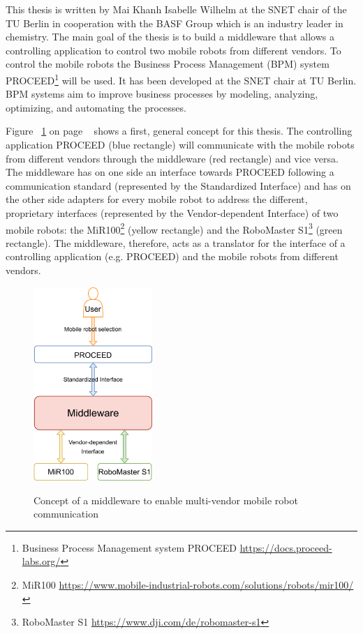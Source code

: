 This thesis is written by Mai Khanh Isabelle Wilhelm at the SNET chair of the TU Berlin in cooperation with the BASF Group which is an industry leader in chemistry. The main goal of the thesis is to build a middleware that allows a controlling application to control two mobile robots from different vendors. To control the mobile robots the Business Process Management (BPM) system PROCEED\footnote{Business Process Management system PROCEED \url{https://docs.proceed-labs.org/}} will be used. It has been developed at the SNET chair at TU Berlin. BPM systems aim to improve business processes by modeling, analyzing, optimizing, and automating the processes. 

Figure ~\ref{fig:introduction__middleware} on page ~\pageref{fig:introduction__middleware} shows a first, general concept for this thesis. The controlling application PROCEED (blue rectangle) will communicate with the mobile robots from different vendors through the middleware (red rectangle) and vice versa. The middleware has on one side an interface towards PROCEED following a communication standard (represented by the Standardized Interface) and has on the other side adapters for every mobile robot to address the different, proprietary interfaces (represented by the Vendor-dependent Interface) of two mobile robots: the MiR100\footnote{MiR100 \url{https://www.mobile-industrial-robots.com/solutions/robots/mir100/}} (yellow rectangle) and the RoboMaster S1\footnote{RoboMaster S1 \url{https://www.dji.com/de/robomaster-s1}} (green rectangle).  The middleware, therefore, acts as a translator for the interface of a controlling application (e.g. PROCEED) and the mobile robots from different vendors. 

\begin{figure}[!ht]
	\centering
	\includegraphics[width=0.4\textwidth]{images/Middleware.png}\\
	\caption[Compact Routing Example]%
    {Concept of a middleware to enable multi-vendor mobile robot communication}
	\label{fig:introduction__middleware}
\end{figure}

